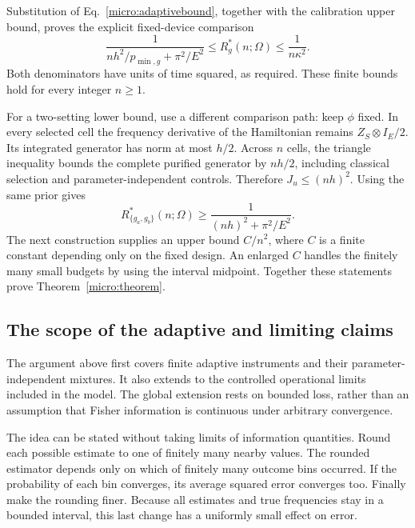 \documentclass[11pt,a4paper]{article}
\numberwithin{equation}{section}
\theoremstyle{remark}
\begin{document}
Substitution of Eq.~\eqref{micro:adaptivebound}, together with the
calibration upper bound, proves the explicit fixed-device comparison
\begin{equation}
 \boxed{\quad
 \frac1{nh^2/p_{\min,g}+\pi^2/E^2}
 \le R_g^*(n;\Omega)
 \le\frac1{n\kappa^2}.
 \quad}
 \label{micro:fixedfinite}
\end{equation}
Both denominators have units of time squared, as required. These finite
bounds hold for every integer $n\ge1$.

For a two-setting lower bound, use a different comparison path: keep
$\phi$ fixed. In every selected cell the frequency derivative of the
Hamiltonian remains $Z_S\otimes I_E/2$. Its integrated generator has norm
at most $h/2$. Across $n$ cells, the triangle inequality bounds the
complete purified generator by $nh/2$, including classical selection and
parameter-independent controls. Therefore $J_u\le(nh)^2$. Using the
same prior gives
\begin{equation}
 R_{\{g_a,g_b\}}^*(n;\Omega)
 \ge\frac1{(nh)^2+\pi^2/E^2}.
 \label{micro:menulower}
\end{equation}
The next construction supplies an upper bound $C/n^2$, where $C$ is a
finite constant depending only on the fixed design. An enlarged $C$
handles the finitely many small budgets by using the interval midpoint.
Together these statements prove Theorem~\ref{micro:theorem}.

\subsection{The scope of the adaptive and limiting claims}
\label{micro:limits}

The argument above first covers finite adaptive instruments and their
parameter-independent mixtures. It also extends to the controlled
operational limits included in the model. The global extension rests on
bounded loss, rather than an assumption that Fisher information is
continuous under arbitrary convergence.

The idea can be stated without taking limits of information quantities.
Round each possible estimate to one of finitely many nearby values. The
rounded estimator depends only on which of finitely many outcome bins
occurred. If the probability of each bin converges, its average squared
error converges too. Finally make the rounding finer. Because all estimates
and true frequencies stay in a bounded interval, this last change has a
uniformly small effect on error.
\end{document}
